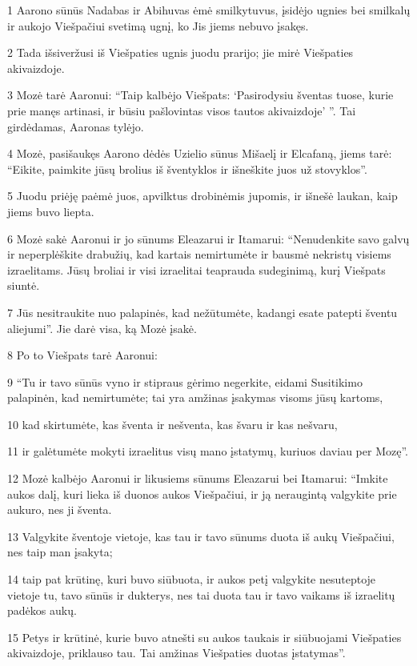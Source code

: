 \par 1 Aarono sūnūs Nadabas ir Abihuvas ėmė smilkytuvus, įsidėjo ugnies bei smilkalų ir aukojo Viešpačiui svetimą ugnį, ko Jis jiems nebuvo įsakęs. 
\par 2 Tada išsiveržusi iš Viešpaties ugnis juodu prarijo; jie mirė Viešpaties akivaizdoje. 
\par 3 Mozė tarė Aaronui: “Taip kalbėjo Viešpats: ‘Pasirodysiu šventas tuose, kurie prie manęs artinasi, ir būsiu pašlovintas visos tautos akivaizdoje’ ”. Tai girdėdamas, Aaronas tylėjo. 
\par 4 Mozė, pasišaukęs Aarono dėdės Uzielio sūnus Mišaelį ir Elcafaną, jiems tarė: “Eikite, paimkite jūsų brolius iš šventyklos ir išneškite juos už stovyklos”. 
\par 5 Juodu priėję paėmė juos, apvilktus drobinėmis jupomis, ir išnešė laukan, kaip jiems buvo liepta. 
\par 6 Mozė sakė Aaronui ir jo sūnums Eleazarui ir Itamarui: “Nenudenkite savo galvų ir neperplėškite drabužių, kad kartais nemirtumėte ir bausmė nekristų visiems izraelitams. Jūsų broliai ir visi izraelitai teaprauda sudeginimą, kurį Viešpats siuntė. 
\par 7 Jūs nesitraukite nuo palapinės, kad nežūtumėte, kadangi esate patepti šventu aliejumi”. Jie darė visa, ką Mozė įsakė. 
\par 8 Po to Viešpats tarė Aaronui: 
\par 9 “Tu ir tavo sūnūs vyno ir stipraus gėrimo negerkite, eidami Susitikimo palapinėn, kad nemirtumėte; tai yra amžinas įsakymas visoms jūsų kartoms, 
\par 10 kad skirtumėte, kas šventa ir nešventa, kas švaru ir kas nešvaru, 
\par 11 ir galėtumėte mokyti izraelitus visų mano įstatymų, kuriuos daviau per Mozę”. 
\par 12 Mozė kalbėjo Aaronui ir likusiems sūnums Eleazarui bei Itamarui: “Imkite aukos dalį, kuri lieka iš duonos aukos Viešpačiui, ir ją neraugintą valgykite prie aukuro, nes ji šventa. 
\par 13 Valgykite šventoje vietoje, kas tau ir tavo sūnums duota iš aukų Viešpačiui, nes taip man įsakyta; 
\par 14 taip pat krūtinę, kuri buvo siūbuota, ir aukos petį valgykite nesuteptoje vietoje tu, tavo sūnūs ir dukterys, nes tai duota tau ir tavo vaikams iš izraelitų padėkos aukų. 
\par 15 Petys ir krūtinė, kurie buvo atnešti su aukos taukais ir siūbuojami Viešpaties akivaizdoje, priklauso tau. Tai amžinas Viešpaties duotas įstatymas”. 
